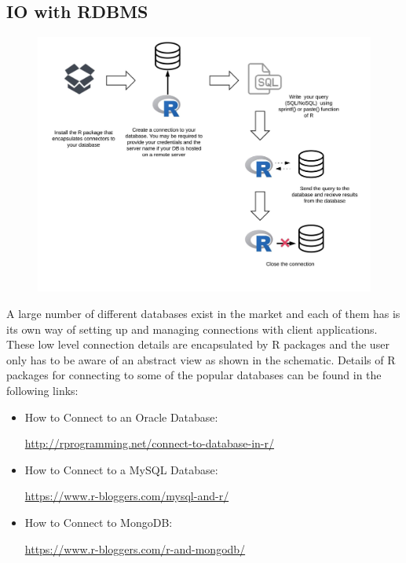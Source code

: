 \documentclass[12pt]{book}\usepackage{knitr}
\begin{document}
\subsection{IO with RDBMS}
\begin{figure}[ht]
 \centering
    \includegraphics[width = 15 cm]{./viz/ext/IO_R_RDBMS.jpeg}
\end{figure}
\begin{HIGHLIGHT}
A large number of different databases exist in the market and each of them has is its own way of setting up and managing connections with client applications. These low level connection details are encapsulated by R packages and the user only has to be aware of an abstract view as shown in the schematic. Details of R packages for connecting to some of the popular databases can be found in the following links:
\begin{itemize}
  \item How to Connect to an Oracle Database:
  
  \textcolor{cyan}{\url {http://rprogramming.net/connect-to-database-in-r/}}
  \item How to Connect to a MySQL Database:
  
  \textcolor{cyan}{\url {https://www.r-bloggers.com/mysql-and-r/}}
  \item How to Connect to MongoDB: 
  
  \textcolor{cyan}{\url {https://www.r-bloggers.com/r-and-mongodb/}}
\end{itemize}
\end{HIGHLIGHT}
\end{document}
